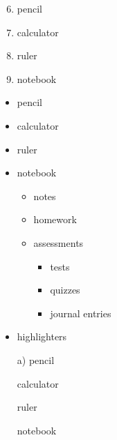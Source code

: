 \documentclass[11pt]{article}
\begin{document}
\vspace{1 cm}

\begin{enumerate}\setcounter{enumi}{5}
\item pencil
\item calculator
\item ruler
\item notebook
\end{enumerate}

\pagebreak

\begin{itemize}
\item pencil
\item calculator
\item ruler
\item notebook
	\begin{itemize}
	\item notes
	\item homework
	\item assessments
		\begin{itemize}
		\item tests
		\item quizzes
		\item journal entries
		\end{itemize}
	\end{itemize}
\item highlighters
\end{itemize}

\vspace{1 cm}
\begin{itemize}
\item[a)] pencil
\item[] calculator
\item[] ruler
\item[] notebook
\end{itemize}
\end{document}
